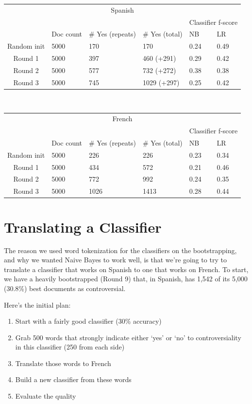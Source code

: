 \documentclass[11pt]{article} %
\begin{document}
\begin{tabular}{|c|l|l|l|l|l|}
\multicolumn{6}{|c|}{Spanish} \\
\rowcolor{gray!50} &&&& \multicolumn{2}{|c|}{Classifier f-score} \\
\rowcolor{gray!50} & Doc count & \# Yes (repeats) & \# Yes (total) & NB & LR \\
Random init & 5000 & 170 & 170 & 0.24 & 0.49 \\
Round 1 & 5000 & 397 & 460 (+291) & 0.29 & 0.42 \\
Round 2 & 5000 & 577 & 732 (+272) & 0.38 & 0.38 \\
Round 3 & 5000 & 745 & 1029 (+297) & 0.25 & 0.42 \\
\end{tabular} \\
\begin{tabular}{|c|l|l|l|l|l|}
\multicolumn{6}{|c|}{French} \\
\rowcolor{gray!50} &&&& \multicolumn{2}{|c|}{Classifier f-score} \\
\rowcolor{gray!50} & Doc count & \# Yes (repeats) & \# Yes (total) & NB & LR \\
Random init & 5000 & 226 & 226 & 0.23 & 0.34 \\
Round 1 & 5000 & 434 & 572 & 0.21 & 0.46 \\
Round 2 & 5000 & 772 & 992 & 0.24 & 0.35 \\
Round 3 & 5000 & 1026 & 1413 & 0.28 & 0.44 \\
\end{tabular}

\section{Translating a Classifier}
The reason we used word tokenization for the classifiers on the bootstrapping, and why we wanted Naive Bayes to work well, is that we're going to try to translate a classifier that works on Spanish to one that works on French. To start, we have a heavily bootstrapped (Round 9) that, in Spanish, has 1,542 of its 5,000 (30.8\%) best documents as controversial.

Here's the initial plan:
\begin{enumerate}
\item Start with a fairly good classifier (30\% accuracy)
\item Grab 500 words that strongly indicate either `yes' or `no' to controversiality in this classifier (250 from each side) 
\item Translate those words to French
\item Build a new classifier from these words
\item Evaluate the quality
\end{enumerate}
\end{document}
